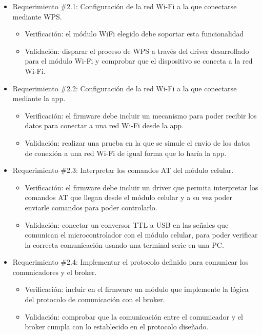 \documentclass[
11pt, %
codirector, %
]{charter}
\begin{document}
\begin{itemize}
	\item Requerimiento \#2.1: Configuración de la red Wi-Fi a la que conectarse mediante WPS.
	\begin{itemize}
		\item Verificación: el módulo WiFi elegido debe soportar esta funcionalidad
		\item Validación: disparar el proceso de WPS a través del driver desarrollado para el
módulo Wi-Fi y comprobar que el dispositivo se conecta a la red Wi-Fi.
	\end{itemize}
			
	\item Requerimiento \#2.2: Configuración de la red Wi-Fi a la que conectarse mediante la app.
	\begin{itemize}
		\item Verificación: el firmware debe incluir un mecanismo para poder recibir los datos para conectar a una red Wi-Fi desde la app.
		\item Validación: realizar una prueba en la que se simule el envío de los datos de conexión a una red Wi-Fi de igual forma que lo haría la app.
	\end{itemize}
			
	\item Requerimiento \#2.3: Interpretar los comandos AT del módulo celular.
	\begin{itemize}
		\item Verificación: el firmware debe incluir un driver que permita interpretar los comandos AT que llegan desde el módulo celular y a su vez poder enviarle comandos para poder controlarlo.
		\item Validación: conectar un conversor TTL a USB en las señales que comunican el microcontrolador con el módulo celular, para poder verificar la correcta comunicación usando una terminal serie en una PC.
	\end{itemize}
			
	\item Requerimiento \#2.4: Implementar el protocolo definido para comunicar los comunicadores y el broker.
	\begin{itemize}
		\item Verificación: incluir en el firmware un módulo que implemente la lógica del protocolo de comunicación con el broker.
		\item Validación: comprobar que la comunicación entre el comunicador y el broker cumpla con lo establecido en el protocolo diseñado.
	\end{itemize}
			

\end{itemize}
\end{document}
